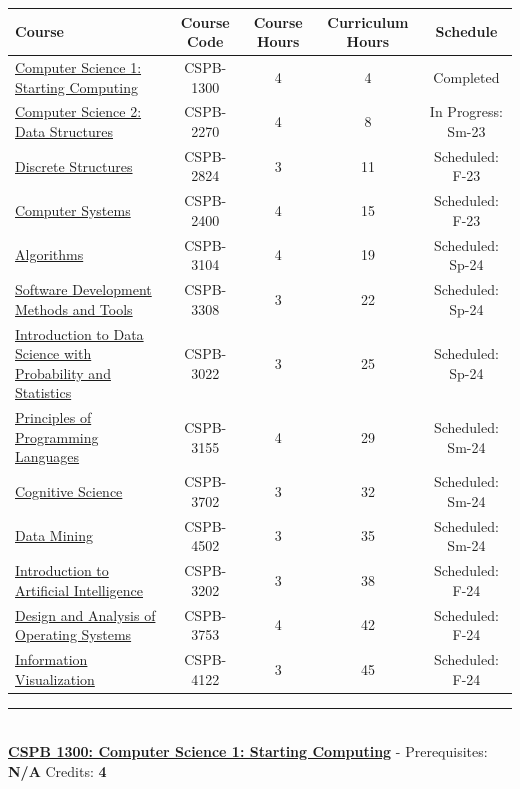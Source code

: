\documentclass{article}
\newcommand{\horizontalline}{\noindent \rule{\textwidth}{0.5pt} \\}
\newcommand{\coreclass}{\cellcolor{yellow!25}}
\newcommand{\electiveclass}{\cellcolor{gray!25}}
\newcommand{\credithours}{\cellcolor{cyan!25}}
\newcommand{\header}{\cellcolor{gray!25}}
\newcommand{\completed}{\cellcolor{green!25} Completed}
\newcommand{\inprogress}{\cellcolor{orange!25} In Progress}
\newcommand{\scheduled}{\cellcolor{magenta!25} Scheduled}
\newcommand{\CSPBIntro}{\href{https://www.colorado.edu/program/cspb/cspb-1300-computer-science-1-starting-computing}{Computer Science 1: Starting Computing}}
\newcommand{\CSPBDataStruct}{\href{https://www.colorado.edu/program/cspb/cspb-2270-computer-science-2-data-structures}{Computer Science 2: Data Structures}}
\newcommand{\CSPBCompSys}{\href{https://www.colorado.edu/program/cspb/cspb-2400-computer-systems}{Computer Systems}}
\newcommand{\CSPBDisc}{\href{https://www.colorado.edu/program/cspb/cspb-2824-discrete-structures}{Discrete Structures}}
\newcommand{\CSPBAlgo}{\href{https://www.colorado.edu/program/cspb/cspb-3104-algorithms}{Algorithms}}
\newcommand{\CSPBPrincProg}{\href{https://www.colorado.edu/program/cspb/cspb-3155-principles-programming-languages}{Principles of Programming Languages}}
\newcommand{\CSPBSoftDev}{\href{https://www.colorado.edu/program/cspb/cspb-3308-software-development-methods-and-tools}{Software Development Methods and Tools}}
\newcommand{\CSPBDataSci}{\href{https://www.colorado.edu/program/cspb/cspb-3022-introduction-data-science-probability-and-statistics}{Introduction to Data Science with Probability and Statistics}}
\newcommand{\CSPBArtIntell}{\href{https://www.colorado.edu/program/cspb/cspb-3202-introduction-artificial-intelligence}{Introduction to Artificial Intelligence}}
\newcommand{\CSPBCogSci}{\href{https://www.colorado.edu/program/cspb/cspb-3702-cognitive-science}{Cognitive Science}}
\newcommand{\CSPBOpSys}{\href{https://www.colorado.edu/program/cspb/cspb-3753-design-and-analysis-operating-systems}{Design and Analysis of Operating Systems}}
\newcommand{\CSPBInfoVis}{\href{https://www.colorado.edu/program/cspb/cspb-4122-information-visualization}{Information Visualization}}
\newcommand{\CSPBDataMin}{\href{https://www.colorado.edu/program/cspb/cspb-4502-data-mining}{Data Mining}}
\begin{document}
\begin{table}[ht]
\centering
\begin{tabular}{|p{6cm}|c|c|c|c|}
     \hline \header \textbf{Course} & \header \textbf{Course Code} & \header \textbf{Course Hours} & \header \textbf{Curriculum Hours} & \header \textbf{Schedule} \\ \hline
     \coreclass \CSPBIntro & \coreclass CSPB-1300 & \credithours 4 & \credithours 4 & \completed \\ \hline
     \coreclass \CSPBDataStruct & \coreclass CSPB-2270 & \credithours 4 & \credithours 8 & \inprogress: Sm-23 \\ \hline
     \coreclass \CSPBDisc & \coreclass CSPB-2824 & \credithours 3 & \credithours 11 & \scheduled: F-23 \\ \hline
     \coreclass \CSPBCompSys & \coreclass CSPB-2400 & \credithours 4 & \credithours 15 & \scheduled: F-23 \\ \hline
     \coreclass \CSPBAlgo & \coreclass CSPB-3104 & \credithours 4 & \credithours 19 & \scheduled: Sp-24 \\ \hline
     \coreclass \CSPBSoftDev & \coreclass CSPB-3308 & \credithours 3 & \credithours 22 & \scheduled: Sp-24 \\ \hline
     \electiveclass \CSPBDataSci & \electiveclass CSPB-3022 & \credithours 3 & \credithours 25 & \scheduled: Sp-24 \\ \hline
     \coreclass \CSPBPrincProg & \coreclass CSPB-3155 & \credithours 4 & \credithours 29 & \scheduled: Sm-24 \\ \hline
     \electiveclass \CSPBCogSci & \electiveclass CSPB-3702 & \credithours 3 & \credithours 32 & \scheduled: Sm-24 \\ \hline
     \electiveclass \CSPBDataMin & \electiveclass CSPB-4502 & \credithours 3 & \credithours 35 & \scheduled: Sm-24 \\ \hline
     \electiveclass \CSPBArtIntell & \electiveclass CSPB-3202 & \credithours 3 & \credithours 38 & \scheduled: F-24 \\ \hline
     \electiveclass \CSPBOpSys & \electiveclass CSPB-3753 & \credithours 4 & \credithours 42 & \scheduled: F-24 \\ \hline
     \electiveclass \CSPBInfoVis & \electiveclass  CSPB-4122 & \credithours 3 & \credithours 45 & \scheduled: F-24 \\ \hline
\end{tabular}
\end{table}

\horizontalline
\noindent \href{https://www.colorado.edu/program/cspb/cspb-1300-computer-science-1-starting-computing}{\textbf{CSPB 1300: Computer Science 1: Starting Computing}} - Prerequisites: \textbf{N/A} Credits: \textbf{4} \\
\end{document}
